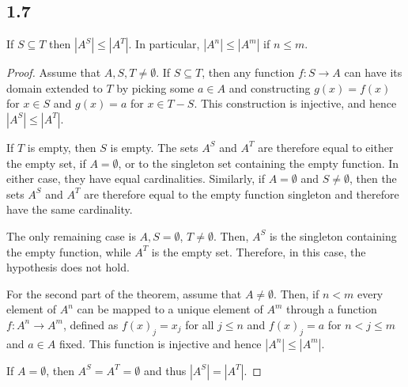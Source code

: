 \subsection*{1.7} If $S \subseteq T$ then $|A^S| \leq |A^T|$. In particular, $|A^n| \leq |A^m|$ if $n \leq m$. 

\begin{proof}
Assume that $A, S, T \neq \emptyset$. If $S \subseteq T$, then any function $f: S \rightarrow A$ can have its domain extended to $T$ by picking some $a \in A$ and constructing $g(x) = f(x)$ for $x \in S$ and $g(x) = a$ for $x \in T - S$. This construction is injective, and hence $|A^S| \leq |A^T|$.

If $T$ is empty, then $S$ is empty. The sets $A^S$ and $A^T$ are therefore equal to either the empty set, if $A=\emptyset$, or to the singleton set containing the empty function. In either case, they have equal cardinalities. Similarly, if $A=\emptyset$ and $S \neq \emptyset$, then the sets $A^S$ and $A^T$ are therefore equal to the empty function singleton and therefore have the same cardinality.

The only remaining case is $A,S=\emptyset$, $T\neq\emptyset$. Then, $A^S$ is the singleton containing the empty function, while $A^T$ is the empty set. Therefore, in this case, the hypothesis does not hold.

\vspace{1em}
For the second part of the theorem, assume that $A \neq \emptyset$. Then, if $n < m$ every element of $A^n$ can be mapped to a unique element of $A^m$ through a function $f:A^n \rightarrow A^m$, defined as $f(x)_j = x_j$ for all $j \leq n$ and $f(x)_j = a$ for $n < j \leq m$ and $a \in A$ fixed. This function is injective and hence $|A^n| \leq |A^m|$.

If $A = \emptyset$, then $A^S = A^T = \emptyset$ and thus $|A^S| = |A^T|$.
\end{proof}

